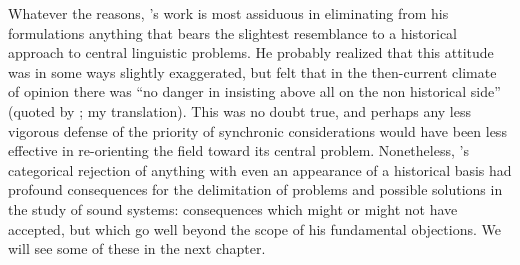 Whatever the reasons, {\Saussure}'s work is most assiduous in eliminating
from his formulations anything that bears the slightest resemblance to
a historical approach to central linguistic problems.  He probably
realized that this attitude was in some ways slightly exaggerated, but
felt that in the then-current climate of opinion there was ``no danger
in insisting above all on the non historical side'' (quoted by
\citet[45]{godel57:sources}; my translation).  This was no doubt true,
and perhaps any less vigorous defense of the priority of synchronic
considerations would have been less effective in re-orienting the
field toward its central problem.  Nonetheless, {\Saussure}'s categorical
rejection of anything with even an appearance of a historical basis
had profound consequences for the delimitation of problems and
possible solutions in the study of sound systems: consequences which
{\Saussure} might or might not have accepted, but which go well beyond
the scope of his fundamental objections. We will see some of these in
the next chapter.

